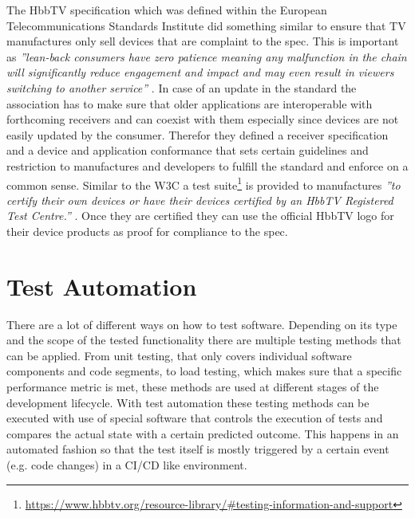 The HbbTV specification which was defined within the European Telecommunications Standards Institute did something similar to ensure that TV manufactures only sell devices that are complaint to the spec. This is important as \textit{''lean-back consumers have zero patience meaning any malfunction in the chain will significantly reduce engagement and impact and may even result in viewers switching to another service''} \cite{hbbtvtesting}. In case of an update in the standard the association has to make sure that older applications are interoperable with forthcoming receivers and can coexist with them especially since devices are not easily updated by the consumer. Therefor they defined a receiver specification and a device and application conformance that sets certain guidelines and restriction to manufactures and developers to fulfill the standard and enforce on a common sense. Similar to the W3C a test suite\footnote{\url{https://www.hbbtv.org/resource-library/\#testing-information-and-support}} is provided to manufactures \textit{''to certify their own devices or have their devices certified by an HbbTV Registered Test Centre.''} \cite{hbbtvtesting}. Once they are certified they can use the official HbbTV logo for their device products as proof for compliance to the spec.

\section{Test Automation\label{sec:testautomation}}

There are a lot of different ways on how to test software. Depending on its type and the scope of the tested functionality there are multiple testing methods that can be applied. From unit testing, that only covers individual software components and code segments, to load testing, which makes sure that a specific performance metric is met, these methods are used at different stages of the development lifecycle. With test automation these testing methods can be executed with use of special software that controls the execution of tests and compares the actual state with a certain predicted outcome. This happens in an automated fashion so that the test itself is mostly triggered by a certain event (e.g. code changes) in a CI/CD like environment.

